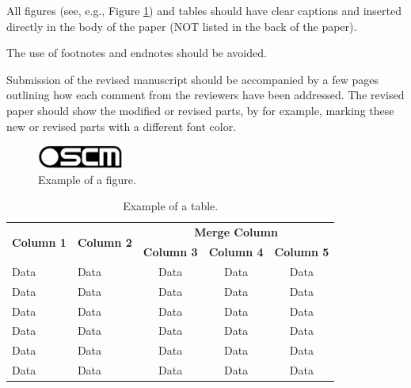 \documentclass[preprint]{oscmjournal}
\begin{document}
All figures (see, e.g., Figure \ref{fig:example_figure}) and tables should have clear captions and inserted directly in the body of the paper (NOT listed in the back of the paper).

The use of footnotes and endnotes should be avoided. 

Submission of the revised manuscript should be accompanied by a few pages outlining how each comment from the reviewers have been addressed. The revised paper should show the modified or revised parts, by for example, marking these new or revised parts with a different font color.

\begin{figure}[htbp]
    \centering
    \includegraphics[width=0.25\textwidth]{figs/oscm.png}
    \caption{Example of a figure.}
    \label{fig:example_figure}
\end{figure}

\begin{table}[ht]
    \sffamily \small
    \centering
    \caption{Example of a table.}
    \begin{tabular*}{\textwidth}{@{\extracolsep{\fill}}llccc}
        \toprule
        \multicolumn{1}{c}{\multirow{2}{*}{\textbf{Column 1}}} & \multicolumn{1}{c}{\multirow{2}{*}{\textbf{Column 2}}} & \multicolumn{3}{c}{\textbf{Merge Column}} \\
        \cmidrule{3-5}
        \multicolumn{1}{c}{}                                   & \multicolumn{1}{c}{}                                   & \textbf{Column 3} & \textbf{Column 4} & \textbf{Column 5} \\ 
        \midrule
        Data                                                   & Data                                                   & Data              & Data              & Data              \\
        Data                                                   & Data                                                   & Data              & Data              & Data              \\
        Data                                                   & Data                                                   & Data              & Data              & Data              \\
        Data                                                   & Data                                                   & Data              & Data              & Data              \\
        Data                                                   & Data                                                   & Data              & Data              & Data              \\
        Data                                                   & Data                                                   & Data              & Data              & Data              \\ 
        \bottomrule
    \end{tabular*}
    \normalsize\normalfont
\end{table}
\end{document}
